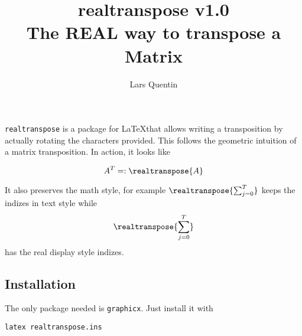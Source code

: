 \documentclass{article}
\title{realtranspose v1.0\\The REAL way to transpose a Matrix}
\author{Lars Quentin}
\begin{document}
\maketitle

\texttt{realtranspose} is a package for \LaTeX that allows writing a transposition by 
actually rotating the characters provided. This follows the geometric intuition of a
matrix transposition. In action, it looks like

\[
  A^T =: \realtranspose{A}
\]

It also preserves the math style, for example $\realtranspose{ \sum_{j = 0}^T }$ keeps
the indizes in text style while
\[
\realtranspose{ \sum_{j = 0}^T }
\]
has the real display style indizes.
\subsection*{Installation}
The only package needed is \texttt{graphicx}. Just install it with
\begin{lstlisting}
latex realtranspose.ins
\end{lstlisting}
\end{document}
